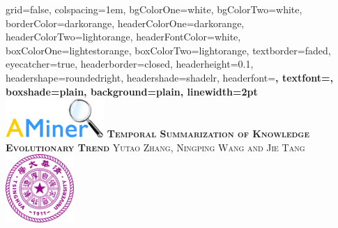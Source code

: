 \documentclass[portrait,final,a0paper,fontscale=0.277]{baposter}
\begin{document}


\begin{poster}%
  {
  grid=false,
  colspacing=1em,
  bgColorOne=white,
  bgColorTwo=white,
  borderColor=darkorange,
  headerColorOne=darkorange,
  headerColorTwo=lightorange,
  headerFontColor=white,
  boxColorOne=lightestorange,
  boxColorTwo=lightorange,
  textborder=faded,
  eyecatcher=true,
  headerborder=closed,
  headerheight=0.1\textheight,
  headershape=roundedright,
  headershade=shadelr,
  headerfont=\Large\bf\textsc, %
  textfont={\setlength{\parindent}{1.5em}},
  boxshade=plain,
  background=plain,
  linewidth=2pt
  }
  {\includegraphics[height=4em]{images/Aminer_logo_big.png}} 
  {\bf\textsc{Temporal Summarization of Knowledge Evolutionary Trend}\vspace{0.5em}}
  {\textsc{ Yutao Zhang, Ningping Wang and Jie Tang }}
  {%
    \includegraphics[height=7.0em]{images/Tsinghua_University_Logo.png}
  }


\end{poster}
\end{document}
